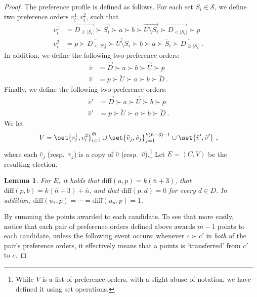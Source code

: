 \documentclass[letterpaper]{article} %
\newtheorem{lemma}{Lemma}
\newcommand{\ora}[1]{\overrightarrow{#1}}
\newcommand{\ola}[1]{\overleftarrow{#1}}
\newcommand{\abs}[1]{\lvert{#1}\rvert}
\newcommand{\diff}{\mathrm{diff}}
\begin{document}
\begin{proof}
The preference profile is defined as follows. For each set $S_i \in \mathcal{S}$, we define two preference orders $v_i^1,v_i^2$, such that
\begin{align}
    v_i^1 &= \ora{D_{\geq \abs{S_i}}} \succ  \ora{S_i}  \succ  a \succ b \succ \ora{U \setminus S_i}\succ \ora{D_{<\abs{S_i}}} \succ p   \\
    v_i^2 &=  p  \succ \ola{D_{<\abs{S_i}}} \succ \ola{U \setminus S_i} \succ b \succ a \succ \ola{S_i} \succ  \ola{D_{\geq \abs{S_i}}}\ .
\end{align}
In addition, we define the following two preference orders:
\begin{align}
    \bar{v} &=  \ora{D} \succ a \succ b \succ  \ora{U}  \succ p \\
    \hat{v} &=  p \succ \ola{U}  \succ a \succ b \succ \ola{D} \ .
\end{align}
Finally, we define the following two preference orders:
\begin{align}
    \bar{v}' &= \ora{D} \succ a \succ \ora{U} \succ b  \succ p  \\
    \hat{v}' &=  p \succ \ola{U}  \succ a \succ b \succ \ola{D}\ .
\end{align}
We let
$$V=\set{v_i^1,v_i^2}_{i=1}^{\bar{m}} \cup \set{\bar{v}_j, \hat{v}_j}_{j=1}^{k(\bar{n}+3)-1} \cup \set{\bar{v}', \hat{v}'}\ ,$$
where each $\bar{v}_j$ (resp.\  $\hat{v}_j$) is a copy of $\bar{v}$ (resp.\  $\hat{v}$).\footnote{While $V$ is a list of preference orders, with a slight abuse of notation, we have defined it using set operations.} Let $E = (C,V)$ be the resulting election.
\begin{lemma}
For $E$, it holds that  $\diff(a,p)=k(\bar{n}+3)$,  that $\diff(p,b)= k(\bar{n}+3) + \bar{n}$, and that
  $\diff(p,d)= 0$  for every $d \in D$. In addition, $\diff(u_1,p)=\cdots=\diff(u_{\bar{n}},p)=1$.
\end{lemma}
By summing the points awarded to each candidate. To see that more easily, notice that each pair of preference orders defined above awards $m-1$ points to each candidate, unless the following event occurs: whenever $c \succ c'$ in \emph{both} of the pair's preference orders, it effectively means that a points is `transferred' from $c'$ to $c$.


\end{proof}
\end{document}

